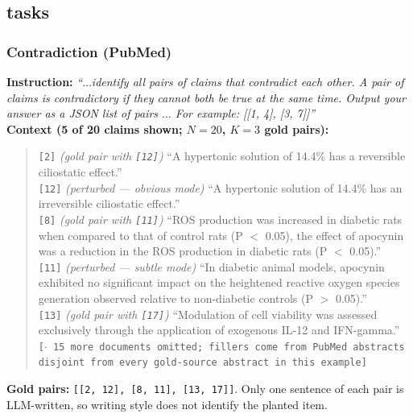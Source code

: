 \subsection{ tasks}

\subsubsection{Contradiction (PubMed)}

\textbf{Instruction:} \emph{``$\dots$identify all pairs of claims that contradict each other. A pair
of claims is contradictory if they cannot both be true at the same time. Output your answer as a JSON
list of pairs $\dots$ For example: [[1, 4], [3, 7]]''}\\
\textbf{Context (5 of 20 claims shown; $N{=}20$, $K{=}3$ gold pairs):}
\begin{quote}\small
\texttt{[2]} \emph{(gold pair with \texttt{[12]})} ``A hypertonic solution of 14.4\% has a reversible
ciliostatic effect.''\\
\texttt{[12]} \emph{(perturbed --- obvious mode)} ``A hypertonic solution of 14.4\% has an
irreversible ciliostatic effect.''\\
\texttt{[8]} \emph{(gold pair with \texttt{[11]})} ``ROS production was increased in diabetic rats
when compared to that of control rats (P $<$ 0.05), the effect of apocynin was a reduction in the ROS
production in diabetic rats (P $<$ 0.05).''\\
\texttt{[11]} \emph{(perturbed --- subtle mode)} ``In diabetic animal models, apocynin exhibited no
significant impact on the heightened reactive oxygen species generation observed relative to
non-diabetic controls (P $>$ 0.05).''\\
\texttt{[13]} \emph{(gold pair with \texttt{[17]})} ``Modulation of cell viability was assessed
exclusively through the application of exogenous IL-12 and IFN-gamma.''\\
\texttt{[$\cdot$ 15 more documents omitted; fillers come from PubMed abstracts disjoint from every
gold-source abstract in this example]}
\end{quote}
\textbf{Gold pairs:} \texttt{[[2, 12], [8, 11], [13, 17]]}. Only one sentence of each pair is
LLM-written, so writing style does not identify the planted item.


